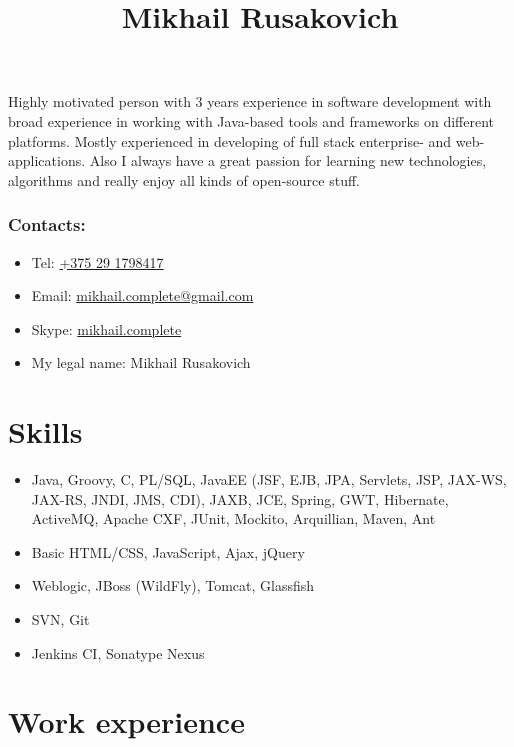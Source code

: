 \documentclass[a4paper, 12pt]{article}
\title{Mikhail Rusakovich}
\author{}
\date{}
\begin{document}
\maketitle

Highly motivated person with 3 years experience in software development with broad experience in working with Java-based tools and frameworks on different platforms.
Mostly experienced in developing of full stack enterprise- and web- applications.
Also I always have a great passion for learning new technologies, algorithms and really enjoy all kinds of open-source stuff.

\subsubsection*{Contacts:}
\begin{itemize}
    \item Tel: \href{tel:+375291798417}{+375 29 1798417}
    \item Email: \href{mailto:mikhail.complete@gmail.com}{mikhail.complete@gmail.com}
    \item Skype: \href{callto:mikhail.complete}{mikhail.complete}
    \item My legal name: Mikhail Rusakovich
\end{itemize}


\section*{Skills}

    \begin{itemize}
        \item Java, Groovy, C, PL/SQL, JavaEE (JSF, EJB, JPA, Servlets, JSP, JAX-WS, JAX-RS, JNDI, JMS, CDI), JAXB, JCE, Spring, GWT, Hibernate, ActiveMQ, Apache CXF, JUnit, Mockito, Arquillian, Maven, Ant
        \item Basic HTML/CSS, JavaScript, Ajax, jQuery
        \item Weblogic, JBoss (WildFly), Tomcat, Glassfish
        \item SVN, Git
        \item Jenkins CI, Sonatype Nexus 
    \end{itemize}


\section*{Work experience}
\end{document}
